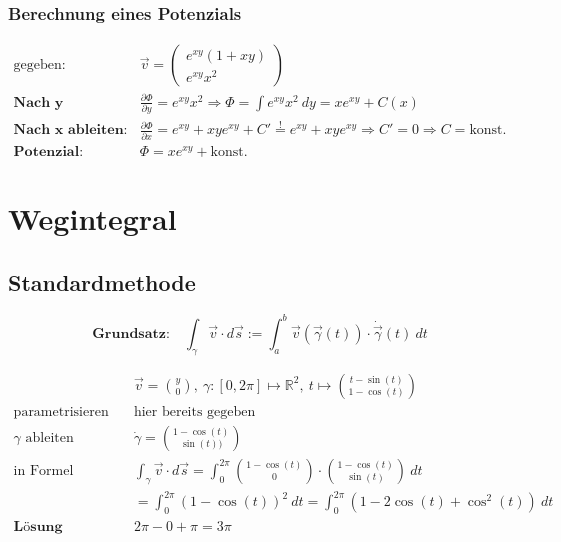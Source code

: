 \documentclass[11pt]{article}
\begin{document}
\subsubsection*{Berechnung eines Potenzials}

\begin{equation*}
\begin{split}
	\text{gegeben:} \quad & \vec{v} = \begin{pmatrix}
		e^{xy}(1+xy) \\ e^{xy}x^2
	\end{pmatrix} \\
	\textbf{Nach y integrieren:} \quad & \frac{\partial\Phi}{\partial y} = e^{xy}x^2 \Rightarrow \Phi = \int e^{xy}x^2\ dy = xe^{xy} + C(x) \\
	\textbf{Nach x ableiten:} \quad & \frac{\partial\Phi}{\partial x} = e^{xy} + xye^{xy} + C' \stackrel{!}{=} e^{xy} + xye^{xy} \Rightarrow C' = 0 \Rightarrow C = \text{konst.} \\
	\textbf{Potenzial:} \quad & \Phi = xe^{xy} + \text{konst.}
\end{split}
\end{equation*}

\section{Wegintegral}

\subsection{Standardmethode}

\begin{equation*}
	\textbf{Grundsatz:}\quad \int_\gamma \vec{v}\cdot d\vec{s} := \int_a^b \vec{v}(\vec{\gamma}(t)) \cdot \dot\vec{\gamma}(t)\ dt
\end{equation*}

\begin{equation*}
\begin{split}
	& \vec{v} = \binom{y}{0},\ \gamma:[0, 2\pi] \mapsto \mathbb{R}^2,\ t \mapsto \binom{t -\sin(t)}{1-\cos(t)} \\
	\text{parametrisieren}\quad & \text{hier bereits gegeben} \\
	\text{$\gamma$ ableiten}\quad & \dot\gamma = \binom{1-\cos(t)}{\sin(t))} \\
	\text{in Formel einsetzen}\quad & \int_\gamma \vec{v} \cdot d\vec{s} = \int_0^{2\pi} \binom{1-\cos(t)}{0}\cdot\binom{1-\cos(t)}{\sin(t)}\ dt \\
	&= \int_0^{2\pi} (1-\cos(t))^2\ dt = \int_0^{2\pi} (1-2\cos(t)+\cos^2(t))\ dt \\
	\textbf{L{\"o}sung}\quad & 2\pi - 0 + \pi = 3\pi
\end{split}
\end{equation*}
\end{document}
